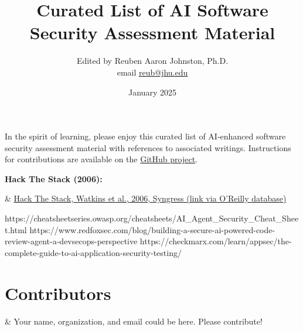 \documentclass[a4paper]{article}
\title{Curated List of AI Software Security Assessment Material}
\author{Edited by Reuben Aaron Johnston, Ph.D. \\ email \href{mailto:reub@jhu.edu}{reub@jhu.edu}}
\date{January 2025}
\begin{document}
	\maketitle
	
	In the spirit of learning, please enjoy this curated list of AI-enhanced software security assessment material with references to associated writings.  Instructions for contributions are available on the \href{https://github.com/reubenajohnston/CuratedCyberReads}{GitHub project}.
	
	\bigskip\noindent

	\noindent\textbf{Hack The Stack (2006):}
	\begin{easylist}[itemize]
	& \href{}{Hack The Stack, Watkins et al., 2006, Syngress (link via O'Reilly database)}
  	\end{easylist}

	https://cheatsheetseries.owasp.org/cheatsheets/AI_Agent_Security_Cheat_Sheet.html
  https://www.redfoxsec.com/blog/building-a-secure-ai-powered-code-review-agent-a-devsecops-perspective
  https://checkmarx.com/learn/appsec/the-complete-guide-to-ai-application-security-testing/
   


	\section*{Contributors}
 	\begin{easylist}[itemize]
  	& Your name, organization, and email could be here.  Please contribute!
	\end{easylist}
\end{document}
